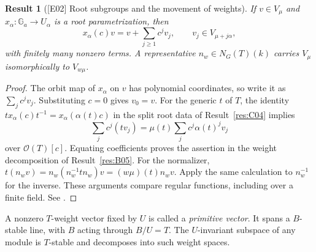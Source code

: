 \documentclass[11pt,a4paper,openany,oneside]{book}
\theoremstyle{resultstyle}
\newtheorem{statement}{Result}[chapter]
\newenvironment{result}[2]{\clubpenalty=10000\begin{statement}[\textnormal{[#1]} #2]\leavevmode\label{res:#1}\ignorespaces}{\end{statement}}
\theoremstyle{definition}
\numberwithin{equation}{chapter}
\begin{document}
\begin{result}{E02}{Root subgroups and the movement of weights}
If \(v\in V_\mu\) and \(x_\alpha\colon\mathbb G_a\to U_\alpha\) is a root parametrization, then
\[
 x_\alpha(c)v=v+\sum_{j\geq1}c^j v_j,\qquad v_j\in V_{\mu+j\alpha},
\]
with finitely many nonzero terms. A representative \(n_w\in N_G(T)(k)\) carries \(V_\mu\) isomorphically to \(V_{w\mu}\).
\end{result}
\begin{proof}
The orbit map of \(x_\alpha\) on \(v\) has polynomial coordinates, so write it as \(\sum_j c^jv_j\). Substituting \(c=0\) gives \(v_0=v\). For the generic \(t\) of \(T\), the identity \(t x_\alpha(c)t^{-1}=x_\alpha(\alpha(t)c)\) in the split root data of Result~\ref{res:C04} implies
\[
 \sum_j c^j(t v_j)=\mu(t)\sum_j c^j\alpha(t)^jv_j
\]
over \(\mathcal O(T)[c]\). Equating coefficients proves the assertion in the weight decomposition of Result~\ref{res:B05}. For the normalizer, \(t(n_w v)=n_w(n_w^{-1}tn_w)v=(w\mu)(t)n_wv\). Apply the same calculation to \(n_w^{-1}\) for the inverse. These arguments compare regular functions, including over a finite field. See \cite[22.14--22.15]{milne}.
\end{proof}

A nonzero \(T\)-weight vector fixed by \(U\) is called a \emph{primitive vector}. It spans a \(B\)-stable line, with \(B\) acting through \(B/U=T\). The \(U\)-invariant subspace of any module is \(T\)-stable and decomposes into such weight spaces.
\end{document}
